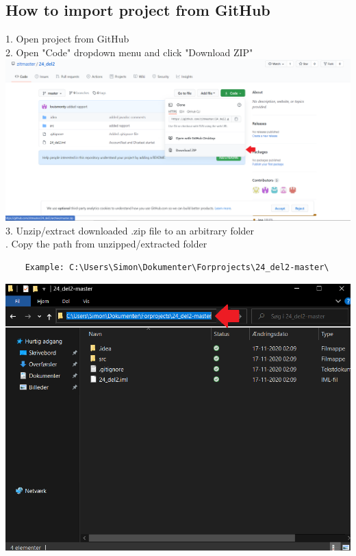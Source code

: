 
\begin{flushleft}
 \doublespacing   
    \subsection{How to import project from GitHub}
    1. Open project from GitHub\\
    2. Open "Code" dropdown menu and click "Download ZIP"\\
    \vspace{5mm}
    \includegraphics[width=16.5cm]{Report/root/step1.png}\\
    3. Unzip/extract downloaded .zip file to an arbitrary folder\\
    . Copy the path from unzipped/extracted folder\\
    \begin{verbatim}
    Example: C:\Users\Simon\Dokumenter\Forprojects\24_del2-master\    
    \end{verbatim}
    \includegraphics[width=16.5cm]{Report/root/step2.png}\\

\end{flushleft}
